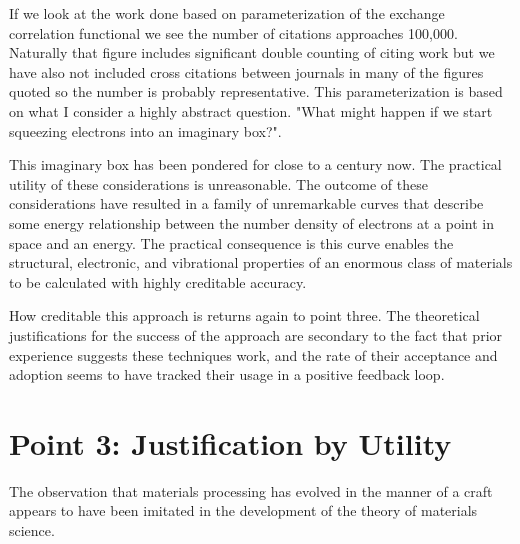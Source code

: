 If we look at the work done based on parameterization of the exchange correlation functional 
we see the number of citations approaches 100,000. Naturally that figure includes significant 
double counting of citing work but we have also not included cross citations between journals in many of the 
figures quoted so the number is probably representative. This parameterization is based on 
what I consider a highly abstract question. "What might happen if we start squeezing electrons into an imaginary box?".

This imaginary box has been pondered for close to a century now. The practical utility of these considerations is unreasonable. 
The outcome of these considerations have resulted in a family of unremarkable curves that describe some energy relationship between
the number density of electrons at a point in space and an energy. The practical consequence is this curve enables the
structural, electronic, and vibrational properties of an enormous class of materials to be calculated with highly creditable accuracy.

How creditable this approach is returns again to point three. The theoretical justifications for the success of the approach are
secondary to the fact that prior experience suggests these techniques work, and the rate of their acceptance and adoption
seems to have tracked their usage in a positive feedback loop. 



\section{Point 3: Justification by Utility}
The observation that materials processing has evolved in the manner of a craft appears to have
been imitated in the development of the theory of materials science.

